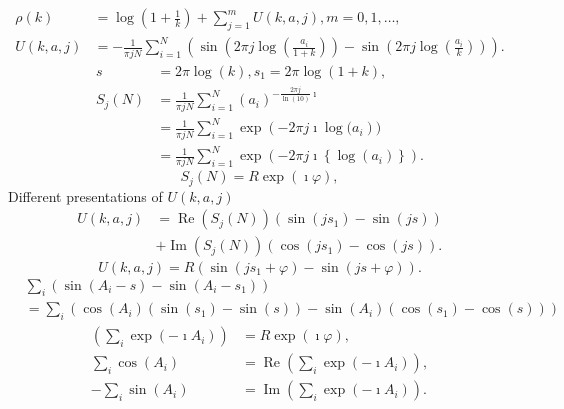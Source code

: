 \documentclass[titlepage,fleqn]{article}%
\begin{document}
\begin{align*}
\rho(k)  &  =\log\left(  1+\frac{1}{k}\right)  +%
{\displaystyle\sum\limits_{j=1}^{m}}
U(k,a,j),m=0,1,\ldots,\\
U(k,a,j)  &  =-\frac{1}{\pi jN}%
{\displaystyle\sum\limits_{i=1}^{N}}
\left(  \sin\left(  2\pi j\log\left(  \frac{a_{i}}{1+k}\right)  \right)
-\sin\left(  2\pi j\log\left(  \frac{a_{i}}{k}\right)  \right)  \right)  .
\end{align*}%
\begin{align*}
s  &  =2\pi\log(k),s_{1}=2\pi\log(1+k),\\
S_{j}(N)  &  =\frac{1}{\pi jN}%
{\displaystyle\sum\limits_{i=1}^{N}}
\left(  a_{i}\right)  ^{-\frac{2\pi j}{\ln(10)}\imath}\\
&  =\frac{1}{\pi jN}%
{\displaystyle\sum\limits_{i=1}^{N}}
\exp\left(  -2\pi j\imath\log(a_{i}\right)  )\\
&  =\frac{1}{\pi jN}%
{\displaystyle\sum\limits_{i=1}^{N}}
\exp\left(  -2\pi j\imath\left\{  \log\left(  a_{i}\right)  \right\}  \right)
.
\end{align*}%
\[
S_{j}(N)=R\exp(\imath\varphi),
\]
Different presentations of $U(k,a,j)$
\begin{align*}
U(k,a,j)  &  =\operatorname{Re}(S_{j}(N))\left(  \sin(js_{1})-\sin(js)\right)
\\
&  +\operatorname{Im}(S_{j}(N))\left(  \cos(js_{1})-\cos(js)\right)  .
\end{align*}%
\[
U(k,a,j)=R\left(  \sin(js_{1}+\varphi)-\sin(js+\varphi)\right)  .
\]%
\begin{align*}
&
{\displaystyle\sum\limits_{i}}
\left(  \sin(A_{i}-s)-\sin(A_{i}-s_{1})\right) \\
&  =%
{\displaystyle\sum\limits_{i}}
\left(  \cos(A_{i})(\sin(s_{1})-\sin(s))-\sin(A_{i})(\cos(s_{1})-\cos
(s))\right)
\end{align*}%
\begin{align*}
\left(
{\displaystyle\sum\limits_{i}}
\exp(-\imath A_{i})\right)   &  =R\exp(\imath\varphi),\\%
{\displaystyle\sum\limits_{i}}
\cos(A_{i})  &  =\operatorname{Re}\left(
{\displaystyle\sum\limits_{i}}
\exp(-\imath A_{i})\right)  ,\\
-%
{\displaystyle\sum\limits_{i}}
\sin(A_{i})  &  =\operatorname{Im}\left(
{\displaystyle\sum\limits_{i}}
\exp(-\imath A_{i})\right)  .
\end{align*}
%
\end{document}
